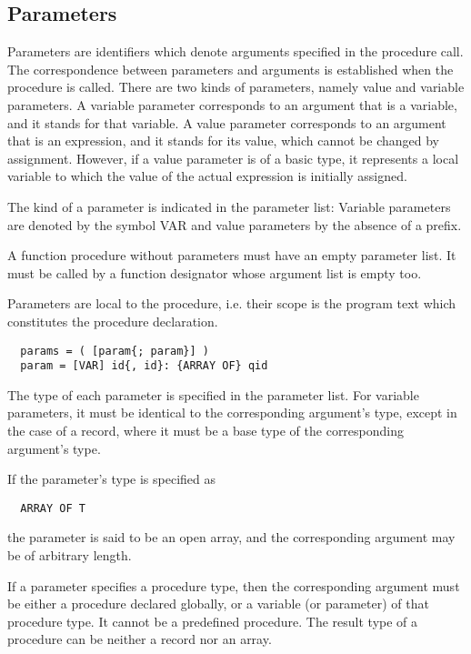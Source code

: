 \subsection{Parameters}
\label{sub:pars}
Parameters are identifiers which denote arguments specified in the procedure call.
The correspondence between parameters and arguments is established when the procedure is
called. There are two kinds of parameters, namely value and variable parameters. A variable
parameter corresponds to an argument that is a variable, and it stands for that variable. A
value parameter corresponds to an argument that is an expression, and it stands for its
value, which cannot be changed by assignment. However, if a value parameter is of a basic type, it
represents a local variable to which the value of the actual expression is initially assigned.

The kind of a parameter is indicated in the parameter list: Variable parameters are denoted
by the symbol VAR and value parameters by the absence of a prefix.

A function procedure without parameters must have an empty parameter list. It must be called by a
function designator whose argument list is empty too.

Parameters are local to the procedure, i.e. their scope is the program text which constitutes
the procedure declaration.
\begin{verbatim}
  params = ( [param{; param}] )
  param = [VAR] id{, id}: {ARRAY OF} qid
\end{verbatim}

The type of each parameter is specified in the parameter list. For variable parameters, it
must be identical to the corresponding argument's type, except in the case of a record,
where it must be a base type of the corresponding argument's type.

If the parameter's type is specified as
\begin{verbatim}
  ARRAY OF T
\end{verbatim}
the parameter is said to be an open array, and the corresponding argument may be of
arbitrary length.

If a parameter specifies a procedure type, then the corresponding argument must be
either a procedure declared globally, or a variable (or parameter) of that procedure type. It cannot
be a predefined procedure. The result type of a procedure can be neither a record nor an array.

